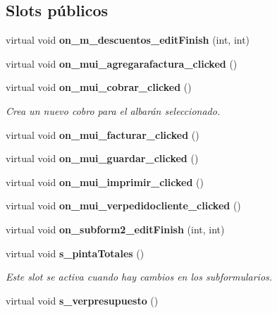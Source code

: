 \subsection*{Slots p\'{u}blicos}
\begin{CompactItemize}
\item 
virtual void {\bf on\_\-m\_\-descuentos\_\-edit\-Finish} (int, int)\label{classAlbaranClienteView_i0}

\item 
virtual void {\bf on\_\-mui\_\-agregarafactura\_\-clicked} ()\label{classAlbaranClienteView_i1}

\item 
virtual void {\bf on\_\-mui\_\-cobrar\_\-clicked} ()\label{classAlbaranClienteView_i2}

\begin{CompactList}\small\item\em Crea un nuevo cobro para el albar\'{a}n seleccionado. \item\end{CompactList}\item 
virtual void {\bf on\_\-mui\_\-facturar\_\-clicked} ()\label{classAlbaranClienteView_i3}

\item 
virtual void {\bf on\_\-mui\_\-guardar\_\-clicked} ()\label{classAlbaranClienteView_i4}

\item 
virtual void {\bf on\_\-mui\_\-imprimir\_\-clicked} ()\label{classAlbaranClienteView_i5}

\item 
virtual void {\bf on\_\-mui\_\-verpedidocliente\_\-clicked} ()\label{classAlbaranClienteView_i6}

\item 
virtual void {\bf on\_\-subform2\_\-edit\-Finish} (int, int)\label{classAlbaranClienteView_i7}

\item 
virtual void {\bf s\_\-pinta\-Totales} ()\label{classAlbaranClienteView_i8}

\begin{CompactList}\small\item\em Este slot se activa cuando hay cambios en los subformularios. \item\end{CompactList}\item 
virtual void {\bf s\_\-verpresupuesto} ()\label{classAlbaranClienteView_i9}

\end{CompactItemize}
